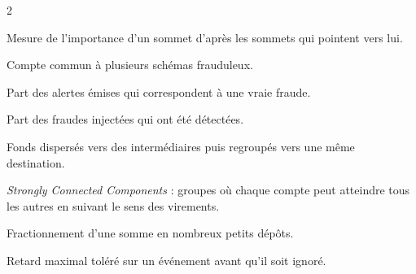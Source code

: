 \documentclass[11pt,a4paper]{report}
\begin{document}
\begin{multicols}{2}
\begin{description}[leftmargin=0pt, itemsep=3pt, font=\sffamily\bfseries]
\item[PageRank] Mesure de l'importance d'un sommet d'après les sommets qui pointent vers lui.
\item[Pivot] Compte commun à plusieurs schémas frauduleux.
\item[Précision] Part des alertes émises qui correspondent à une vraie fraude.
\item[Rappel] Part des fraudes injectées qui ont été détectées.
\item[Scatter-gather] Fonds dispersés vers des intermédiaires puis regroupés vers une même destination.
\item[SCC] \emph{Strongly Connected Components} : groupes où chaque compte peut atteindre tous les autres en suivant le sens des virements.
\item[Smurfing] Fractionnement d'une somme en nombreux petits dépôts.
\item[Watermark] Retard maximal toléré sur un événement avant qu'il soit ignoré.
\end{description}
\end{multicols}

\cleardoublepage
{}















\end{document}
